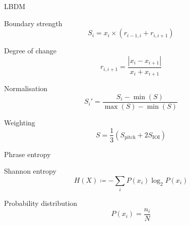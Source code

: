 \documentclass[handout]{beamer}
\begin{document}
\begin{frame}{LBDM}
    \begin{block}{Boundary strength}
        \begin{equation*}
            S_i=x_i\times (r_{i-1, i} + r_{i, i+1})
        \end{equation*}
    \end{block}
    \begin{block}{Degree of change}
        \begin{equation*}
            r_{i, i+1}=\frac{|x_{i}-x_{i+1}|}{x_{i}+x_{i+1}}
        \end{equation*}
    \end{block}
    \begin{block}{Normalisation}
        \begin{equation*}
            S_i'=\frac{S_i-\min(S)}{\max(S)-\min(S)}
        \end{equation*}
    \end{block}
    \begin{block}{Weighting}
        \begin{equation*}
            S=\frac{1}{3}\left( S_\mathrm{pitch} + 2 S_\mathrm{IOI} \right)
        \end{equation*}
    \end{block}
    \hfill\cite{cambouropoulos_lbdm_2011}
\end{frame}

\begin{frame}{Phrase entropy}
    \begin{block}{Shannon entropy}
        \begin{equation*}
            H(X)\coloneq-\sum_i P(x_i)\log_2 P(x_i)
        \end{equation*}
    \end{block}
    \begin{block}{Probability distribution}
        \begin{equation*}
            P(x_i)=\frac{n_i}{N}
        \end{equation*}
    \end{block}
    \hfill\cite{li_automatic_2019}
\end{frame}
\end{document}
